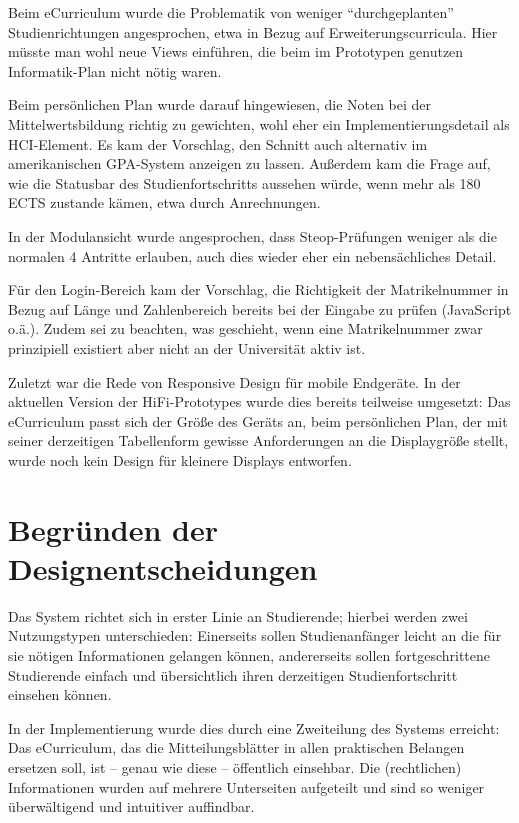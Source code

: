 \documentclass[a4paper,10pt]{scrartcl}
\begin{document}
Beim eCurriculum wurde die Problematik von weniger ``durchgeplanten'' Studienrichtungen angesprochen, etwa in Bezug auf Erweiterungscurricula. Hier müsste man wohl neue Views einführen, die beim im Prototypen genutzen Informatik-Plan nicht nötig waren.

Beim persönlichen Plan wurde darauf hingewiesen, die Noten bei der Mittelwertsbildung richtig zu gewichten, wohl eher ein Implementierungsdetail als HCI-Element. Es kam der Vorschlag, den Schnitt auch alternativ im amerikanischen GPA-System anzeigen zu lassen. Außerdem kam die Frage auf, wie die Statusbar des Studienfortschritts aussehen würde, wenn mehr als 180 ECTS zustande kämen, etwa durch Anrechnungen.

In der Modulansicht wurde angesprochen, dass Steop-Prüfungen weniger als die normalen 4 Antritte erlauben, auch dies wieder eher ein nebensächliches Detail.

Für den Login-Bereich kam der Vorschlag, die Richtigkeit der Matrikelnummer in Bezug auf Länge und Zahlenbereich bereits bei der Eingabe zu prüfen (JavaScript o.ä.). Zudem sei zu beachten, was geschieht, wenn eine Matrikelnummer zwar prinzipiell existiert aber nicht an der Universität aktiv ist.

Zuletzt war die Rede von Responsive Design für mobile Endgeräte. In der aktuellen Version der HiFi-Prototypes wurde dies bereits teilweise umgesetzt: Das eCurriculum passt sich der Größe des Geräts an, beim persönlichen Plan, der mit seiner derzeitigen Tabellenform gewisse Anforderungen an die Displaygröße stellt, wurde noch kein Design für kleinere Displays entworfen.

\section{Begründen der Designentscheidungen}

Das System richtet sich in erster Linie an Studierende; hierbei werden zwei Nutzungstypen unterschieden: Einerseits sollen Studienanfänger leicht an die für sie nötigen Informationen gelangen können, andererseits sollen fortgeschrittene Studierende einfach und übersichtlich ihren derzeitigen Studienfortschritt einsehen können.

In der Implementierung wurde dies durch eine Zweiteilung des Systems erreicht: Das eCurriculum, das die Mitteilungsblätter in allen praktischen Belangen ersetzen soll, ist – genau wie diese – öffentlich einsehbar. Die (rechtlichen) Informationen wurden auf mehrere Unterseiten aufgeteilt und sind so weniger überwältigend und intuitiver auffindbar.
\end{document}
